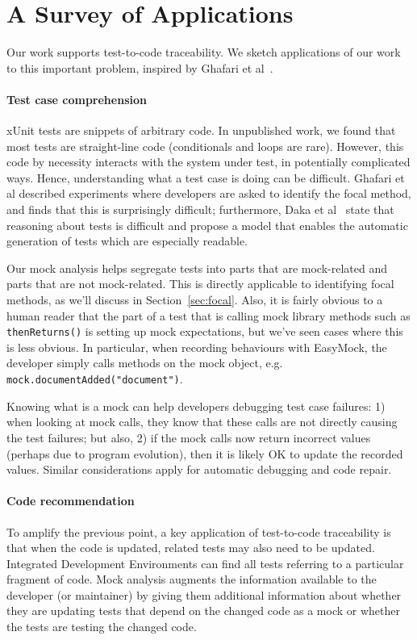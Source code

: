 \section{A Survey of Applications}
\label{sec:applications}

Our work supports test-to-code traceability. 
We sketch applications of our work to this important problem,
inspired by Ghafari et al~\cite{ghafari15:_autom}.

\paragraph{Test case comprehension} xUnit tests are snippets of arbitrary
code. In unpublished work, we found that most tests are
straight-line code (conditionals and loops are rare). 
However, this code by necessity interacts with
the system under test, in potentially complicated ways. Hence,
understanding what a test case is doing can be difficult. Ghafari et
al described experiments where developers are asked to identify the
focal method, and finds that this is surprisingly difficult;
furthermore, Daka et al~\cite{daka15:_model_readab_improv_unit_tests}
state that reasoning about tests is difficult and propose a model that
enables the automatic generation of tests which are especially
readable.

Our mock analysis helps segregate tests into parts that are
mock-related and parts that are not mock-related. This is directly applicable
to identifying focal methods, as we'll discuss in Section~\ref{sec:focal}.
Also, it is fairly
obvious to a human reader that the part of a test that is calling mock
library methods such as \texttt{thenReturns()} is setting up mock
expectations, but we've seen cases where this is less
obvious. In particular, when recording behaviours with EasyMock,
the developer simply calls methods on the mock object, e.g. 
\texttt{mock.documentAdded("document")}.

Knowing what is a mock can help developers debugging test case
failures: 1) when looking at
mock calls, they know that these calls are not
directly causing the test failures; but also, 2) if the mock calls
now return incorrect values (perhaps due to program evolution),
then it is likely OK to update the recorded values. 
Similar considerations
apply for automatic debugging and code repair.

\paragraph{Code recommendation}
To amplify the previous point, a key application of test-to-code
traceability is that when the code is updated, related tests may also
need to be updated. Integrated Development Environments can find
all tests referring to a particular fragment of code. Mock analysis
augments the information available to the developer (or maintainer) by
giving them additional information about whether they are updating
tests that depend on the changed code as a mock or whether the tests
are testing the changed code.

